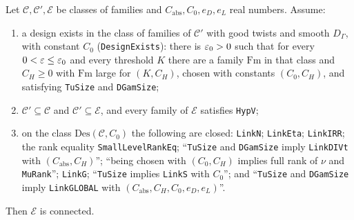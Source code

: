 \begin{theorem}\label{fam:top-des-win}
Let $\mathcal C,\mathcal C',\mathcal E$ be classes of families and $C_{\mathrm{abs}},C_0,e_D,e_L$ real numbers. Assume:
\begin{enumerate}
\item a design exists in the class of families of $\mathcal C'$ with good twists and smooth $D_{\Gamma}$, with constant $C_0$ (\texttt{DesignExists}): there is $\varepsilon_0>0$ such that for every $0<\varepsilon\le\varepsilon_0$ and every threshold $K$ there are a family $\mathrm{Fm}$ in that class and $C_H\ge0$ with $\mathrm{Fm}$ large for $(K,C_H)$, chosen with constants $(C_0,C_H)$, and satisfying \texttt{TuSize} and \texttt{DGamSize};
\item $\mathcal C'\subseteq\mathcal C$ and $\mathcal C'\subseteq\mathcal E$, and every family of $\mathcal E$ satisfies \texttt{HypV};
\item on the class $\mathrm{Des}(\mathcal C,C_0)$ the following are closed: \texttt{LinkN}; \texttt{LinkEta}; \texttt{LinkIRR}; the rank equality \texttt{SmallLevelRankEq}; ``\texttt{TuSize} and \texttt{DGamSize} imply \texttt{LinkDIVt} with $(C_{\mathrm{abs}},C_H)$''; ``being chosen with $(C_0,C_H)$ implies full rank of $\nu$ and \texttt{MuRank}''; \texttt{LinkG}; ``\texttt{TuSize} implies \texttt{LinkS} with $C_0$''; and ``\texttt{TuSize} and \texttt{DGamSize} imply \texttt{LinkGLOBAL} with $(C_{\mathrm{abs}},C_H,C_0,e_D,e_L)$''.
\end{enumerate}
Then $\mathcal E$ is connected.
\end{theorem}
